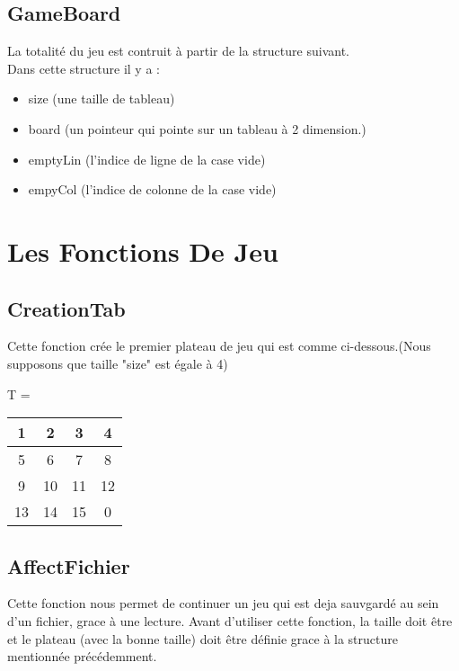 \documentclass{article}
\begin{document}
\subsection{GameBoard}
La totalité du jeu est contruit à partir de la structure suivant.
\\
Dans cette structure il y a : \\

\begin{itemize}
	\item size (une taille de tableau)
	\item board (un pointeur qui pointe sur un tableau à 2 dimension.)
	\item emptyLin (l'indice de ligne de la case vide)
	\item empyCol (l'indice de colonne de la case vide)
\end{itemize}

\newpage

\section{Les Fonctions De Jeu}

\subsection{CreationTab}
Cette fonction crée le premier plateau de jeu qui est comme ci-dessous.(Nous supposons que taille "size" est égale à 4) \\

\begin{center}
	T =
	\begin{tabular}{|c|c|c|c|} \hline
	 1 & 2 & 3 & 4 \\  \hline
	 5 & 6 & 7 & 8 \\  \hline
	 9 & 10 & 11 & 12 \\ \hline
	13 & 14 & 15 & 0 \\ \hline
	\end{tabular}
\end{center}
 

\subsection{AffectFichier}
Cette fonction nous permet de continuer un jeu qui est deja sauvgardé au sein d'un fichier, grace à une lecture. Avant d'utiliser cette fonction, la taille doit être et le plateau (avec la bonne taille) doit être définie grace à la structure mentionnée précédemment.
\end{document}

